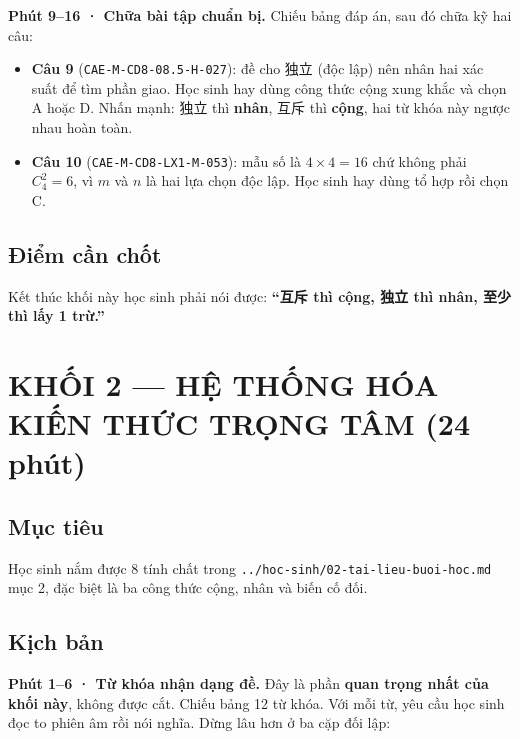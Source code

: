 \documentclass[11pt, a4paper]{article}
\begin{document}
\textbf{Phút 9–16 · Chữa bài tập chuẩn bị.} Chiếu bảng đáp án, sau đó chữa kỹ hai câu:

\begin{itemize}[leftmargin=1.4em, itemsep=2pt]
\item \textbf{Câu 9} (\texttt{CAE-M-CD8-08.5-H-027}): đề cho 独立 (độc lập) nên nhân hai xác suất để tìm phần giao. Học sinh hay dùng công thức cộng xung khắc và chọn A hoặc D. Nhấn mạnh: 独立 thì \textbf{nhân}, 互斥 thì \textbf{cộng}, hai từ khóa này ngược nhau hoàn toàn.
\item \textbf{Câu 10} (\texttt{CAE-M-CD8-LX1-M-053}): mẫu số là $4 \times 4 = 16$ chứ không phải $C_4^2 = 6$, vì $m$ và $n$ là hai lựa chọn độc lập. Học sinh hay dùng tổ hợp rồi chọn C.
\end{itemize}

\subsection{Điểm cần chốt}

Kết thúc khối này học sinh phải nói được: \textbf{“互斥 thì cộng, 独立 thì nhân, 至少 thì lấy 1 trừ.”}

\section{KHỐI 2 — HỆ THỐNG HÓA KIẾN THỨC TRỌNG TÂM (24 phút)}

\subsection{Mục tiêu}

Học sinh nắm được 8 tính chất trong \texttt{../hoc-sinh/02-tai-lieu-buoi-hoc.md} mục 2, đặc biệt là ba công thức cộng, nhân và biến cố đối.

\subsection{Kịch bản}

\textbf{Phút 1–6 · Từ khóa nhận dạng đề.} Đây là phần \textbf{quan trọng nhất của khối này}, không được cắt. Chiếu bảng 12 từ khóa. Với mỗi từ, yêu cầu học sinh đọc to phiên âm rồi nói nghĩa. Dừng lâu hơn ở ba cặp đối lập:

\end{document}
